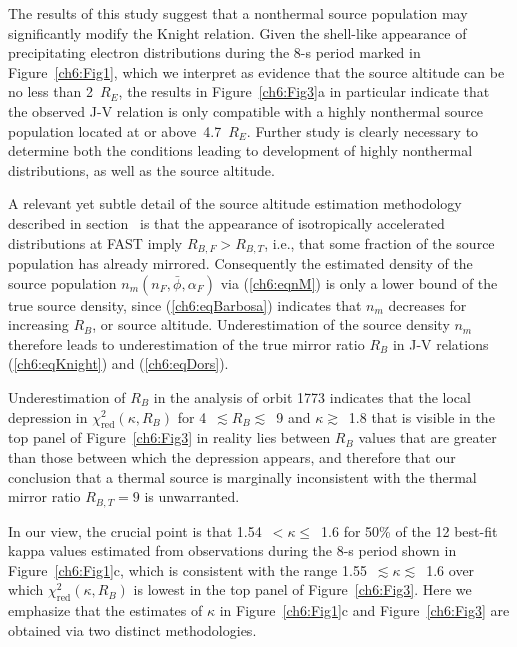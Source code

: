   The results of this study suggest that a nonthermal source population may
  significantly modify the Knight relation. Given the shell-like appearance of
  precipitating electron distributions during the 8-s period marked in
  Figure~\ref{ch6:Fig1}, which we interpret as evidence that the source altitude
  can be no less than 2~$R_E$, the results in Figure~\ref{ch6:Fig3}a in
  particular indicate that the observed J-V relation is only compatible with a
  highly nonthermal source population located at or above~4.7~$R_E$. Further
  study is clearly necessary to determine both the conditions leading to
  development of highly nonthermal distributions, as well as the source
  altitude.

  A relevant yet subtle detail of the source altitude estimation methodology
  described in section~\label{ssSourceAlt} is that the appearance of
  isotropically accelerated distributions at FAST imply $R_{B,F} > R_{B,T}$,
  i.e., that some fraction of the source population has already
  mirrored. Consequently the estimated density of the source population
  $n_m ( n_F, \bar{\phi}, \alpha_F )$ via (\ref{ch6:eqnM}) is only a lower bound
  of the true source density, since (\ref{ch6:eqBarbosa}) indicates that $n_m$
  decreases for increasing $R_B$, or source altitude. Underestimation of the
  source density $n_m$ therefore leads to underestimation of the true mirror
  ratio $R_B$ in J-V relations (\ref{ch6:eqKnight}) and (\ref{ch6:eqDors}).

  Underestimation of $R_B$ in the analysis of orbit 1773 indicates that the
  local depression in $\chi^2_{\mathrm{red}} (\kappa, R_B)$ for
  4~$\lesssim R_B \lesssim$~9 and $\kappa \gtrsim$~1.8 that is visible in the top
  panel of Figure~\ref{ch6:Fig3} in reality lies between $R_B$ values that are
  greater than those between which the depression appears, and therefore that
  our conclusion that a thermal source is marginally inconsistent with the
  thermal mirror ratio $R_{B,T} = 9$ is unwarranted.

  In our view, the crucial point is that 1.54~$< \kappa \leq$~1.6 for 50\% of
  the 12 best-fit kappa values estimated from observations during the 8-s period
  shown in Figure~\ref{ch6:Fig1}c, which is consistent with the range
  1.55~$\lesssim \kappa \lesssim$~1.6 over which
  $\chi^2_{\mathrm{red}} (\kappa, R_B)$ is lowest in the top panel of
  Figure~\ref{ch6:Fig3}. Here we emphasize that the estimates of $\kappa$ in
  Figure~\ref{ch6:Fig1}c and Figure~\ref{ch6:Fig3} are obtained via two distinct
  methodologies.
  
